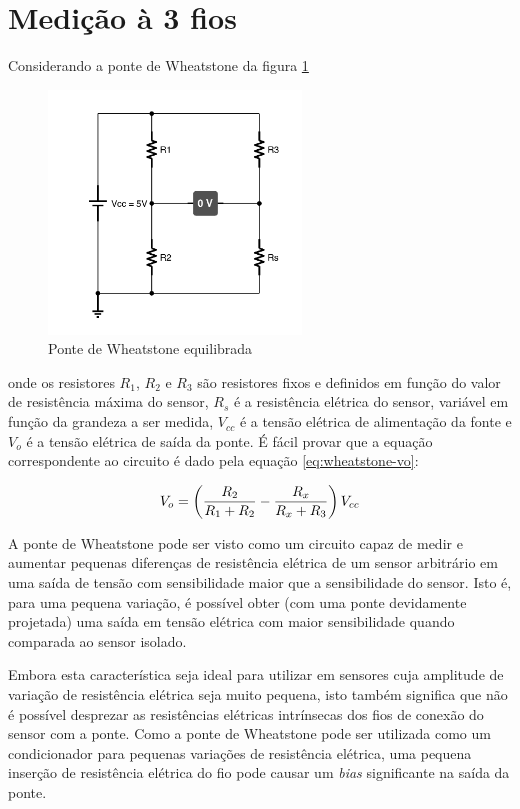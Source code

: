 \documentclass[12pt,a4paper]{instrumentacao}
\begin{document}
\section{Medição à 3 fios}

Considerando a ponte de Wheatstone da figura \ref{fig:3fios-wheatstone}

\begin{figure}[H]
\centering
\includegraphics[width=0.6\textwidth]{Wheatstone-Bridge.pdf}
\caption{Ponte de Wheatstone equilibrada}
\label{fig:3fios-wheatstone}
\end{figure}

onde os resistores $R_1$, $R_2$ e $R_3$ são resistores fixos e definidos em função do valor de resistência máxima do sensor, $R_s$ é a resistência elétrica do sensor, variável em função da grandeza a ser medida, $V_{cc}$ é a tensão elétrica de alimentação da fonte e $V_o$ é a tensão elétrica de saída da ponte. É fácil provar que a equação correspondente ao circuito é dado pela equação \ref{eq:wheatstone-vo}:

\begin{equation}
	V_o = \left({{R_2}\over{R_1 + R_2}} - {{R_x}\over{R_x + R_3}}\right)V_{cc}
	\label{eq:wheatstone-vo}
\end{equation}

A ponte de Wheatstone pode ser visto como um circuito capaz de medir e aumentar pequenas diferenças de resistência elétrica de um sensor arbitrário em uma saída de tensão com sensibilidade maior que a sensibilidade do sensor. Isto é, para uma pequena variação, é possível obter (com uma ponte devidamente projetada) uma saída em tensão elétrica com maior sensibilidade quando comparada ao sensor isolado.

Embora esta característica seja ideal para utilizar em sensores cuja amplitude de variação de resistência elétrica seja muito pequena, isto também significa que não é possível desprezar as resistências elétricas intrínsecas dos fios de conexão do sensor com a ponte. Como a ponte de Wheatstone pode ser utilizada como um condicionador para pequenas variações de resistência elétrica, uma pequena inserção de resistência elétrica do fio pode causar um \textit{bias} significante na saída da ponte.
\end{document}
